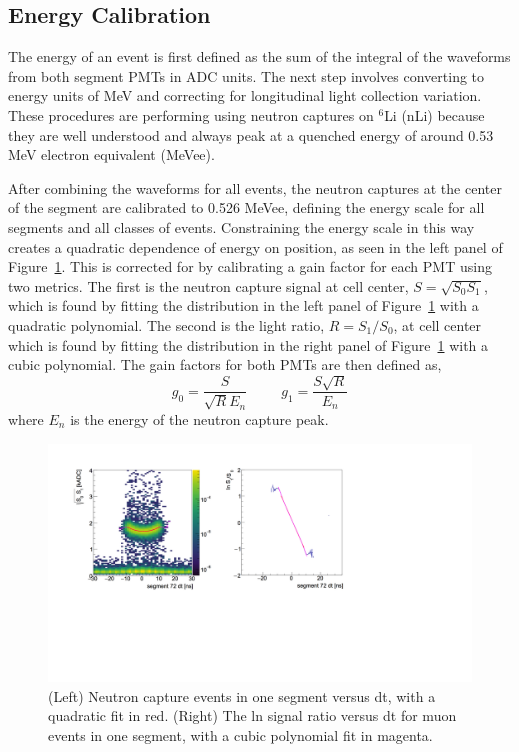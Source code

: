 \newpage
\subsection{Energy Calibration}

The energy of an event is first defined as the sum of the integral of the waveforms from both segment PMTs in ADC units. 
The next step involves converting to energy units of MeV and correcting for longitudinal light collection variation.
These procedures are performing using neutron captures on $^6$Li (nLi) because they are well understood and always peak at a quenched energy of around 0.53 MeV electron equivalent (MeVee). 

After combining the waveforms for all events, the neutron captures at the center of the segment are calibrated to 0.526 MeVee, defining the energy scale for all segments and all classes of events. 
Constraining the energy scale in this way creates a quadratic dependence of energy on position, as seen in the left panel of Figure~\ref{fig:ecorrection}.
This is corrected for by calibrating a gain factor for each PMT using two metrics. 
The first is the neutron capture signal at cell center, $S = \sqrt{S_0S_1}$, which is found by fitting the distribution in the left panel of Figure~\ref{fig:ecorrection} with a quadratic polynomial.
The second is the light ratio, $R = S_1/S_0$, at cell center which is found by fitting the distribution in the right panel of Figure~\ref{fig:ecorrection} with a cubic polynomial.
The gain factors for both PMTs are then defined as, 
\begin{equation}
	g_0 = \frac{S}{\sqrt{R}E_n} ~~~~~~~~~~~ g_1 = \frac{S\sqrt{R}}{E_n}
\end{equation}
where $E_n$ is the energy of the neutron capture peak. 


\begin{figure}[h]
	\centering
	\includegraphics[width=0.9\linewidth]{tex/5-analysis-images/ECorrection}
	\caption[Energy position dependence]{(Left) Neutron capture events in one segment versus dt, with a quadratic fit in red. (Right) The ln signal ratio versus dt for muon events in one segment, with a cubic polynomial fit in magenta.}
	\label{fig:ecorrection}
\end{figure}


